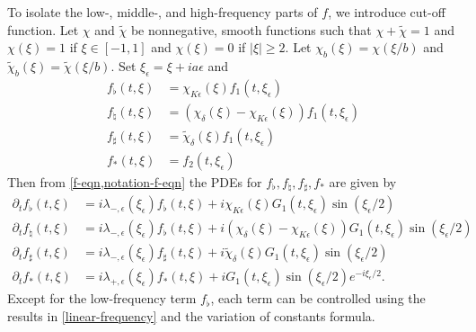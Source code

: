 To isolate the low-, middle-, and high-frequency parts of \(f\), we introduce cut-off function. Let \(\chi\) and \(\tilde\chi\) be nonnegative, smooth functions such that \(\chi + \tilde \chi = 1\) and \(\chi(\xi) = 1\) if \(\xi\in[-1,1]\) and \(\chi(\xi) = 0\) if \(|\xi|\geq 2.\) Let \(\chi_b(\xi) = \chi(\xi/b)\) and \(\tilde \chi_b (\xi) = \tilde \chi(\xi/b)\). Set \(\xi_\epsilon = \xi + i a \epsilon\) and
\begin{align*}
	f_{\flat}(t, \xi) &= \chi_{K\epsilon}(\xi) f_1(t,\xi_\epsilon) \\
	f_{\natural} (t,\xi) &= (\chi_\delta(\xi) - \chi_{K\epsilon}(\xi)) f_1(t, \xi_\epsilon) \\
	f_{\sharp} (t,\xi) &= \tilde \chi_\delta (\xi) f_1(t,\xi_\epsilon) \\
	f_* (t,\xi) &= f_2 (t,\xi_\epsilon)
\end{align*}
Then from \cref{f-eqn,notation-f-eqn} the PDEs for \(f_\flat, f_\natural, f_\sharp, f_*\) are given by
\begin{align}
	\partial_t f_\flat (t, \xi) &= i\lambda_{-,\epsilon}(\xi_\epsilon) f_\flat(t,\xi) + i \chi_{K\epsilon}(\xi) G_1(t,\xi_\epsilon) \sin(\xi_\epsilon/2) \label{f-flat-pde} \\
	\partial_t f_\natural (t,\xi) &= i\lambda_{-, \epsilon}(\xi_\epsilon) f_\flat(t,\xi) + i (\chi_\delta(\xi) - \chi_{K\epsilon}(\xi)) G_1(t,\xi_\epsilon) \sin(\xi_\epsilon/ 2) \\
	\partial_t f_\sharp(t,\xi) &= i\lambda_{-, \epsilon}(\xi_\epsilon) f_\sharp (t,\xi) + i \tilde\chi_{\delta}(\xi) G_1(t,\xi_\epsilon) \sin(\xi_\epsilon/2) \\
	\partial_t f_*(t, \xi) &= i \lambda_{+,\epsilon}(\xi_\epsilon) f_*(t,\xi) + i G_1(t, \xi_\epsilon) \sin(\xi_\epsilon / 2) e^{-i \xi_\epsilon /2}.
\end{align}
Except for the low-frequency term \(f_\flat\), each term can be controlled using the results in \cref{linear-frequency} and the variation of constants formula.

